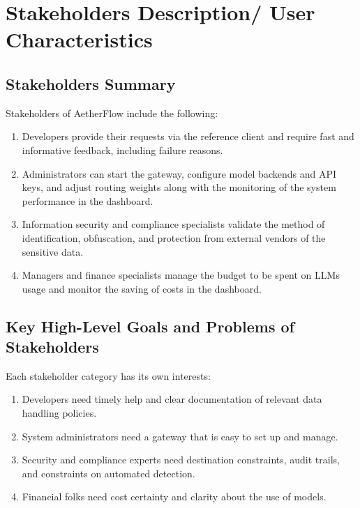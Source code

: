 \documentclass{FastFyp}
\begin{document}
\section{Stakeholders Description/ User Characteristics}
\label{sec:stakeholders}

\subsection{Stakeholders Summary}
\label{subsec:stakeholder-summary}

Stakeholders of AetherFlow include the following:

\begin{enumerate}
    \item Developers provide their requests via the reference client and require fast and informative feedback, including failure reasons.
    \item Administrators can start the gateway, configure model backends and API keys, and adjust routing weights along with the monitoring of the system performance in the dashboard.
    \item Information security and compliance specialists validate the method of identification, obfuscation, and protection from external vendors of the sensitive data.
    \item Managers and finance specialists manage the budget to be spent on LLMs usage and monitor the saving of costs in the dashboard.
\end{enumerate}

\subsection{Key High-Level Goals and Problems of Stakeholders}
\label{subsec:stakeholder-goals}

Each stakeholder category has its own interests:

\begin{enumerate}
    \item Developers need timely help and clear documentation of relevant data handling policies.
    \item System administrators need a gateway that is easy to set up and manage.
    \item Security and compliance experts need destination constraints, audit trails, and constraints on automated detection.
    \item Financial folks need cost certainty and clarity about the use of models.
\end{enumerate}
\end{document}
